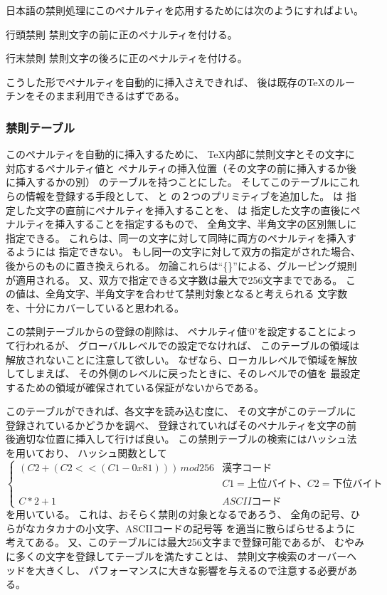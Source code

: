 日本語の禁則処理にこのペナルティを応用するためには次のようにすればよい。
\begin{list}{}{\setlength{\leftmargin}{2cm}}
\item[行頭禁則] 禁則文字の前に正のペナルティを付ける。
\item[行末禁則] 禁則文字の後ろに正のペナルティを付ける。
\end{list}
こうした形でペナルティを自動的に挿入さえできれば、
後は既存の\TeX のルーチンをそのまま利用できるはずである。
%
\subsubsection{禁則テーブル}
このペナルティを自動的に挿入するために、
\TeX 内部に禁則文字とその文字に対応するペナルティ値と
ペナルティの挿入位置（その文字の前に挿入するか後に挿入するかの別）
のテーブルを持つことにした。
そしてこのテーブルにこれらの情報を登録する手段として、
{\bf{}}と{\bf{}}
の２つのプリミティブを追加した。
{\bf{}}は
指定した文字の直前にペナルティを挿入することを、
{\bf{}}は
指定した文字の直後にペナルティを挿入することを指定するもので、
全角文字、半角文字の区別無しに指定できる。
これらは、同一の文字に対して同時に両方のペナルティを挿入するようには
指定できない。 もし同一の文字に対して双方の指定がされた場合、
後からのものに置き換えられる。
勿論これらは``\{\}''による、グルーピング規則が適用される。
又、双方で指定できる文字数は最大で256文字までである。
この値は、全角文字、半角文字を合わせて禁則対象となると考えられる
文字数を、十分にカバーしていると思われる。

この禁則テーブルからの登録の削除は、
ペナルティ値`0'を設定することによって行われるが、
グローバルレベルでの設定でなければ、
このテーブルの領域は解放されないことに注意して欲しい。
なぜなら、ローカルレベルで領域を解放してしまえば、
その外側のレベルに戻ったときに、そのレベルでの値を
最設定するための領域が確保されている保証がないからである。

このテーブルができれば、各文字を読み込む度に、
その文字がこのテーブルに登録されているかどうかを調べ、
登録されていればそのペナルティを文字の前後適切な位置に挿入して行けば良い。
この禁則テーブルの検索にはハッシュ法を用いており、
ハッシュ関数として
\label{`ハッシュ関数'}
\[\left\{ \begin{array}{cl}
	(C2+(C2<<(C1-0x81)))\,mod 256 & 漢字コード\\
	& C1=上位バイト、C2=下位バイト\\
	\\
	C*2+1 & ASCIIコード
	\end{array}
\right. \]
を用いている。
これは、おそらく禁則の対象となるであろう、
全角の記号、ひらがなカタカナの小文字、ASCIIコードの記号等
を適当に散らばらせるように考えてある。
又、このテーブルには最大256文字まで登録可能であるが、
むやみに多くの文字を登録してテーブルを満たすことは、
禁則文字検索のオーバーヘッドを大きくし、
パフォーマンスに大きな影響を与えるので注意する必要がある。


